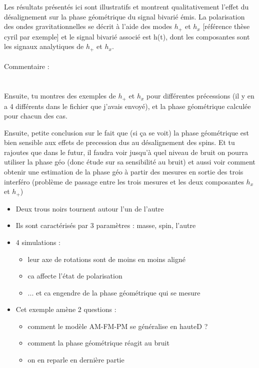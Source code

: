 Les résultats présentés ici sont illustratifs et montrent qualitativement l'effet du désalignement sur la phase géométrique du signal bivarié émis. La polarisation des ondes gravitationnelles se décrit à l'aide des modes $h_+$ et $h_x$ [référence thèse cyril par exemple] et le signal bivarié associé est h(t), dont les composantes sont les signaux analytiques de $h_+$ et $h_x$. 
\\ \\

Commentaire : 
\\ \\ \\
Ensuite, tu montres des exemples de $h_+$ et $h_x$ pour différentes précessions (il y en a 4 différents dans le fichier que j'avais envoyé), et la phase géométrique calculée pour chacun des cas. 

Ensuite, petite conclusion sur le fait que (si ça se voit) la phase géométrique est bien sensible aux effets de precession dus au désalignement des spins. Et tu rajoutes que dans le futur, il faudra voir jusqu'à quel niveau de bruit on pourra utiliser la phase géo (donc étude sur sa sensibilité au bruit) et aussi voir comment obtenir une estimation de la phase géo à partir des mesures en sortie des trois interféro (problème de passage entre les trois mesures et les deux composantes $h_x$ et $h_+$)


\begin{itemize}
	
	\item Deux trous noirs tournent autour l'un de l'autre
	
	\item Ils sont caractérisés par 3 paramètres : masse, spin, l'autre
	
	\item 4 simulations : \begin{itemize}
		
		\item leur axe de rotations sont de moins en moins aligné
		
		\item ca affecte l'état de polarisation 
		
		\item ... et ca engendre de la phase géométrique qui se mesure
	\end{itemize}
	
	\item Cet exemple amène 2 questions : \begin{itemize}
		
		\item comment le modèle AM-FM-PM se généralise en hauteD ?
		
		\item comment la phase géométrique réagit au bruit
		
		\item on en reparle en dernière partie

	\end{itemize}
\end{itemize}

